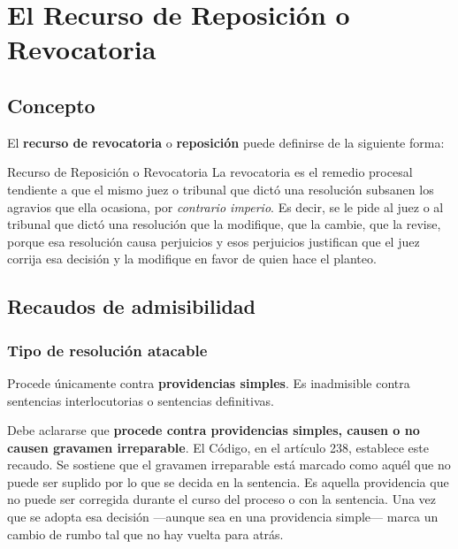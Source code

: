 \documentclass[12pt,oneside]{book}
\begin{document}

\chapter{El Recurso de Reposición o Revocatoria}

\section{Concepto}

El \textbf{recurso de revocatoria} o \textbf{reposición} puede definirse de la siguiente forma:

\begin{definition}{Recurso de Reposición o Revocatoria}
La revocatoria es el remedio procesal tendiente a que el mismo juez o tribunal que dictó una resolución subsanen los agravios que ella ocasiona, por \textit{contrario imperio}. Es decir, se le pide al juez o al tribunal que dictó una resolución que la modifique, que la cambie, que la revise, porque esa resolución causa perjuicios y esos perjuicios justifican que el juez corrija esa decisión y la modifique en favor de quien hace el planteo.
\end{definition}

\section{Recaudos de admisibilidad}

\subsection{Tipo de resolución atacable}

Procede únicamente contra \textbf{providencias simples}. Es inadmisible contra sentencias interlocutorias o sentencias definitivas.

Debe aclararse que \textbf{procede contra providencias simples, causen o no causen gravamen irreparable}. El Código, en el artículo 238, establece este recaudo. Se sostiene que el gravamen irreparable está marcado como aquél que no puede ser suplido por lo que se decida en la sentencia. Es aquella providencia que no puede ser corregida durante el curso del proceso o con la sentencia. Una vez que se adopta esa decisión ---aunque sea en una providencia simple--- marca un cambio de rumbo tal que no hay vuelta para atrás.
\end{document}
